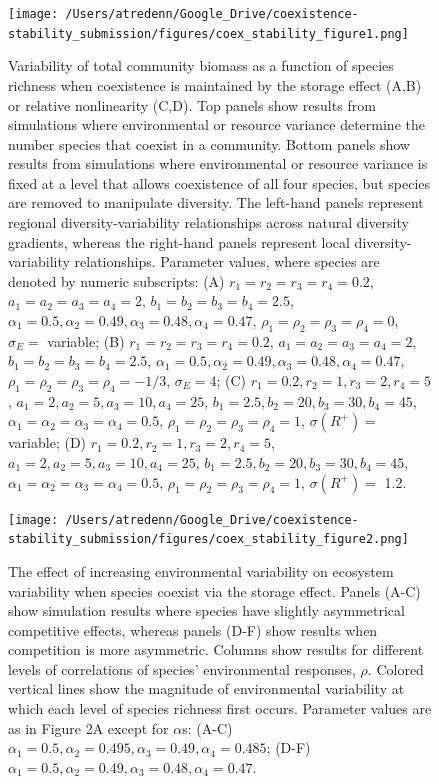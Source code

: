\documentclass[12pt,]{article}
\begin{document}
\begin{figure}[!ht]
  \centering
      \texttt{[image: /Users/atredenn/Google\_Drive/coexistence-stability\_submission/figures/coex\_stability\_figure1.png]}
  \caption{Variability of total community biomass as a function of species richness when coexistence is maintained by the storage effect (A,B) or relative nonlinearity (C,D). Top panels show results from simulations where environmental or resource variance determine the number species that coexist in a community. Bottom panels show results from simulations where environmental or resource variance is fixed at a level that allows coexistence of all four species, but species are removed to manipulate diversity. The left-hand panels represent regional diversity-variability relationships across natural diversity gradients, whereas the right-hand panels represent local diversity-variability relationships. Parameter values, where species are denoted by numeric subscripts: (A) $r_1 = r_2 = r_3 = r_4 = 0.2$, $a_1 = a_2 = a_3 = a_4 = 2$, $b_1 = b_2 = b_3 = b_4 = 2.5$, $\alpha_1 = 0.5, \alpha_2 = 0.49, \alpha_3 = 0.48, \alpha_4 = 0.47$, $\rho_1 = \rho_2 = \rho_3 = \rho_4 = 0$, $\sigma_E =$ variable; (B) $r_1 = r_2 = r_3 = r_4 = 0.2$, $a_1 = a_2 = a_3 = a_4 = 2$, $b_1 = b_2 = b_3 = b_4 = 2.5$, $\alpha_1 = 0.5, \alpha_2 = 0.49, \alpha_3 = 0.48, \alpha_4 = 0.47$, $\rho_1 = \rho_2 = \rho_3 = \rho_4 = -1/3$, $\sigma_E = 4$; (C) $r_1 = 0.2, r_2 = 1, r_3 = 2, r_4 = 5$, $a_1 = 2, a_2 = 5, a_3 = 10, a_4 = 25$, $b_1 = 2.5, b_2 = 20, b_3 = 30, b_4 = 45$, $\alpha_1 = \alpha_2 = \alpha_3 = \alpha_4 = 0.5$, $\rho_1 = \rho_2 = \rho_3 = \rho_4 = 1$, $\sigma(R^+) =$ variable; (D) $r_1 = 0.2, r_2 = 1, r_3 = 2, r_4 = 5$, $a_1 = 2, a_2 = 5, a_3 = 10, a_4 = 25$, $b_1 = 2.5, b_2 = 20, b_3 = 30, b_4 = 45$, $\alpha_1 = \alpha_2 = \alpha_3 = \alpha_4 = 0.5$, $\rho_1 = \rho_2 = \rho_3 = \rho_4 = 1$, $\sigma(R^+) =$ 1.2.}
\end{figure}

\newpage{}

\begin{figure}[!ht]
  \centering
      \texttt{[image: /Users/atredenn/Google\_Drive/coexistence-stability\_submission/figures/coex\_stability\_figure2.png]}
  \caption{The effect of increasing environmental variability on ecosystem variability when species coexist via the storage effect. Panels (A-C) show simulation results where species have slightly asymmetrical competitive effects, whereas panels (D-F) show results when competition is more asymmetric. Columns show results for different levels of correlations of species' environmental responses, $\rho$. Colored vertical lines show the magnitude of environmental variability at which each level of species richness first occurs. Parameter values are as in Figure 2A except for $\alpha$s: (A-C) $\alpha_1 = 0.5, \alpha_2 = 0.495, \alpha_3 = 0.49, \alpha_4 = 0.485$; (D-F) $\alpha_1 = 0.5, \alpha_2 = 0.49, \alpha_3 = 0.48, \alpha_4 = 0.47$.}
\end{figure}
\end{document}
